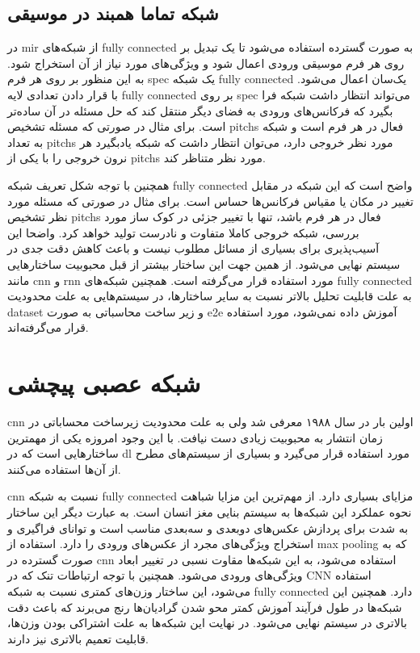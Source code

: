 \subsection{شبکه تماما همبند در موسیقی}
در \gls{mir} از شبکه‌های \gls{fully connected} به صورت گسترده استفاده می‌شود تا
یک تبدیل بر روی هر فرم موسیقی ورودی اعمال شود و ویژگی‌های مورد نیاز از آن
استخراج شود. به این منظور بر روی هر فرم \gls{spec} یک شبکه \gls{fully connected}
یک‌سان اعمال می‌شود. با قرار دادن تعدادی لایه \gls{fully connected} بر روی
\gls{spec} می‌تواند انتظار داشت شبکه فرا بگیرد که فرکانس‌های ورودی به فضای دیگر
منتقل کند که حل مسئله در آن ساده‌تر است. برای مثال در صورتی که مسئله تشخیص
\glspl{pitch} فعال در هر فرم است و شبکه به تعداد \glspl{pitch} مورد نظر خروجی
دارد، می‌توان انتظار داشت که شبکه یادبگیرد هر نرون خروجی را با یکی از
\glspl{pitch} مورد نظر متناظر کند.

همچنین با توجه شکل تعریف شبکه \gls{fully connected} واضح است که این شبکه در
مقابل تغییر در مکان یا مقیاس فرکانس‌ها حساس است. برای مثال در صورتی که مسئله
مورد نظر تشخیص \glspl{pitch} فعال در هر فرم باشد، تنها با تغییر جزئی در کوک ساز
مورد بررسی، شبکه خروجی کاملا متفاوت و نادرست تولید خواهد کرد. واضحا این
آسیب‌پذیری برای بسیاری از مسائل مطلوب نیست و باعث کاهش دقت جدی در سیستم نهایی
می‌شود. از همین جهت این ساختار بیشتر از قبل محبوبیت ساختارهایی مانند \gls{cnn} و
\gls{rnn} مورد استفاده قرار می‌گرفته است. همچنین شبکه‌های \gls{fully connected}
به علت قابلیت تحلیل بالاتر نسبت به سایر ساختارها، در سیستم‌هایی به علت محدودیت
\gls{dataset} و زیر ساخت محاسباتی به صورت \gls{e2e} آموزش داده نمی‌شود، مورد
استفاده قرار می‌گرفته‌اند.

\section{شبکه عصبی پیچشی}
\gls{cnn} اولین بار در سال ۱۹۸۸ معرفی شد ولی به علت محدودیت زیرساخت محساباتی در
زمان انتشار به محبوبیت زیادی دست نیافت. با این وجود امروزه یکی از مهمترین
ساختارهایی است که در \gls{dl} مورد استفاده قرار می‌گیرد و بسیاری از سیستم‌های
مطرح از آن‌ها استفاده می‌کنند.

\gls{cnn} نسبت به شبکه \gls{fully connected} مزایای بسیاری دارد. از مهم‌ترین این
مزایا شباهت نحوه عملکرد این شبکه‌ها به سیستم بنایی مغز انسان است. به عبارت دیگر
این ساختار به شدت برای پردازش عکس‌های دوبعدی و سه‌بعدی مناسب است و توانای
فراگیری و استخراج ویژگی‌های مجرد از عکس‌های ورودی را دارد. استفاده از \gls{max
pooling} که به صورت گسترده در \gls{cnn} استفاده می‌شود، به این شبکه‌ها مقاوت
نسبی در تغییر ابعاد ویژگی‌های ورودی می‌شود. همچنین با توجه ارتباطات تنک که در
\gls{CNN} استفاده می‌شود، این ساختار وزن‌های کمتری نسبت به شبکه \gls{fully
connected} دارد. همچنین این شبکه‌ها در طول فرآیند آموزش کمتر محو شدن گرادیان‌ها
رنج می‌برند که باعث دقت بالاتری در سیستم نهایی می‌شود. در نهایت این شبکه‌ها به
علت اشتراکی بودن وزن‌ها، قابلیت تعمیم بالاتری نیز دارند.

